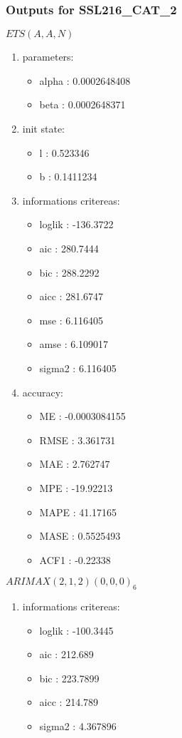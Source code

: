 \documentclass[10pt,a4paper]{article}\usepackage[]{graphicx}\usepackage[]{color}
\newcommand{\AaA}{\_}
\begin{document}
\subsubsection{Outputs for SSL216\AaA CAT\AaA 2}
\begin{multicols}{2}


$ ETS(A,A,N) $
\begin{enumerate}
\item parameters:
\begin{itemize}
\item  alpha :  0.0002648408 
\item  beta :  0.0002648371 
\end{itemize}
\item init state:
\begin{itemize}
\item  l :  0.523346 
\item  b :  0.1411234 
\end{itemize}
\item informations critereas:
\begin{itemize}
\item  loglik :  -136.3722 
\item  aic :  280.7444 
\item  bic :  288.2292 
\item  aicc :  281.6747 
\item  mse :  6.116405 
\item  amse :  6.109017 
\item  sigma2 :  6.116405 
\end{itemize}
\item accuracy:
\begin{itemize}
\item  ME :  -0.0003084155 
\item  RMSE :  3.361731 
\item  MAE :  2.762747 
\item  MPE :  -19.92213 
\item  MAPE :  41.17165 
\item  MASE :  0.5525493 
\item  ACF1 :  -0.22338 
\end{itemize}
\end{enumerate}

\columnbreak


 $ARIMAX(2,1,2)(0,0,0)_{6}$ 
\begin{enumerate}
\item informations critereas:
\begin{itemize}
\item  loglik :  -100.3445 
\item  aic :  212.689 
\item  bic :  223.7899 
\item  aicc :  214.789 
\item  sigma2 :  4.367896 
\end{itemize}


\end{enumerate}
\end{multicols}
\end{document}
